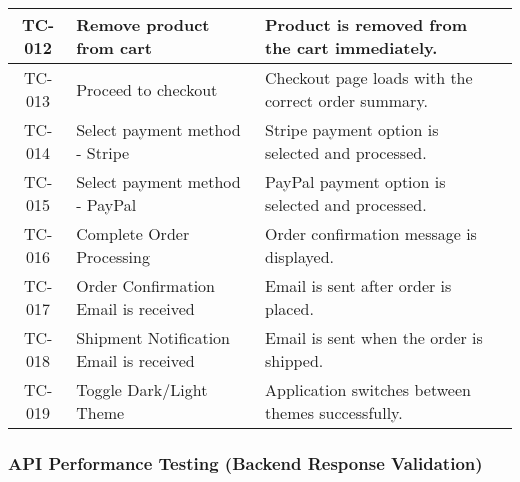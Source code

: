 \documentclass{llncs}
\begin{document}
\begin{longtable}{|c|>{\raggedright}p{6cm}|p{7cm}|p{2cm}|}
TC-012 & Remove product from cart & Product is removed from the cart immediately. & \\ \hline
TC-013 & Proceed to checkout & Checkout page loads with the correct order summary. & \\ \hline
TC-014 & Select payment method - Stripe & Stripe payment option is selected and processed. & \\ \hline
TC-015 & Select payment method - PayPal & PayPal payment option is selected and processed. & \\ \hline
TC-016 & Complete Order Processing & Order confirmation message is displayed. & \\ \hline
TC-017 & Order Confirmation Email is received & Email is sent after order is placed. & \\ \hline
TC-018 & Shipment Notification Email is received & Email is sent when the order is shipped. & \\ \hline
TC-019 & Toggle Dark/Light Theme & Application switches between themes successfully. & \\ \hline
\end{longtable}

\subsubsection{API Performance Testing (Backend Response Validation)}

\renewcommand{\arraystretch}{1.3} %
\end{document}
